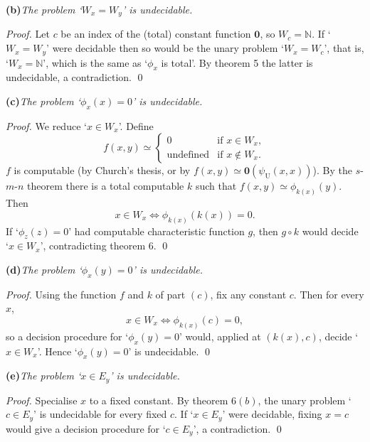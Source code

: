 \documentclass[fleqn]{article}
\begin{document}
\bigskip

\noindent\textbf{(b)}\quad\textit{The problem `$W_x = W_y$' is undecidable.}

\medskip

\textit{Proof.} Let $c$ be an index of the (total) constant function $\mathbf{0}$, so $W_c = \mathbb{N}$. If `$W_x = W_y$' were decidable then so would be the unary problem `$W_x = W_c$', that is, `$W_x = \mathbb{N}$', which is the same as `$\phi_x$ is total'. By theorem 5 the latter is undecidable, a contradiction. \qed

\bigskip

\noindent\textbf{(c)}\quad\textit{The problem `$\phi_x(x) = 0$' is undecidable.}

\medskip

\textit{Proof.} We reduce `$x \in W_x$'. Define
\[
f(x, y) \simeq
\begin{cases}
0 & \text{if } x \in W_x, \\
\text{undefined} & \text{if } x \notin W_x.
\end{cases}
\]
$f$ is computable (by Church's thesis, or by $f(x, y) \simeq \mathbf{0}(\psi_{\mathrm{U}}(x, x))$). By the $s$\nobreakdash-$m$\nobreakdash-$n$ theorem there is a total computable $k$ such that $f(x, y) \simeq \phi_{k(x)}(y)$. Then
\[
x \in W_x \iff \phi_{k(x)}(k(x)) = 0.
\]
If `$\phi_z(z) = 0$' had computable characteristic function $g$, then $g \circ k$ would decide `$x \in W_x$', contradicting theorem 6. \qed

\bigskip

\noindent\textbf{(d)}\quad\textit{The problem `$\phi_x(y) = 0$' is undecidable.}

\medskip

\textit{Proof.} Using the function $f$ and $k$ of part $(c)$, fix any constant $c$. Then for every $x$,
\[
x \in W_x \iff \phi_{k(x)}(c) = 0,
\]
so a decision procedure for `$\phi_x(y) = 0$' would, applied at $(k(x), c)$, decide `$x \in W_x$'. Hence `$\phi_x(y) = 0$' is undecidable. \qed

\bigskip

\noindent\textbf{(e)}\quad\textit{The problem `$x \in E_y$' is undecidable.}

\medskip

\textit{Proof.} Specialise $x$ to a fixed constant. By theorem 6$(b)$, the unary problem `$c \in E_y$' is undecidable for every fixed $c$. If `$x \in E_y$' were decidable, fixing $x = c$ would give a decision procedure for `$c \in E_y$', a contradiction. \qed
\end{document}
